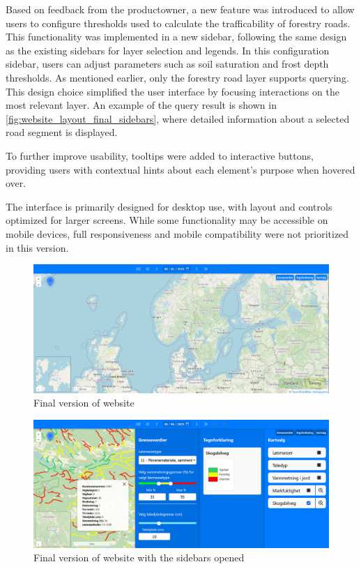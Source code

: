 Based on feedback from the \gls{productowner}, a new feature was introduced to allow users to configure thresholds used to calculate the trafficability of forestry roads. This functionality was implemented in a new sidebar, following the same design as the existing sidebars for layer selection and legends. In this configuration sidebar, users can adjust parameters such as soil saturation and frost depth thresholds. As mentioned earlier, only the forestry road layer supports querying. This design choice simplified the user interface by focusing interactions on the most relevant layer. An example of the query result is shown in \autoref{fig:website_layout_final_sidebars}, where detailed information about a selected road segment is displayed.

To further improve usability, tooltips were added to interactive buttons, providing users with contextual hints about each element's purpose when hovered over.

The interface is primarily designed for desktop use, with layout and controls optimized for larger screens. While some functionality may be accessible on mobile devices, full responsiveness and mobile compatibility were not prioritized in this version.

\begin{figure}[h]
    \centering
    \includegraphics[width=1\linewidth]{figures/website_layout_final.pdf}
    \caption{Final version of website}
    \label{fig:website_layout_final}
\end{figure}

\begin{figure}[h]
    \centering
    \includegraphics[width=1\linewidth]{figures/website_layout_final_sidebars.png}
    \caption{Final version of website with the sidebars opened}
    \label{fig:website_layout_final_sidebars}
\end{figure}


